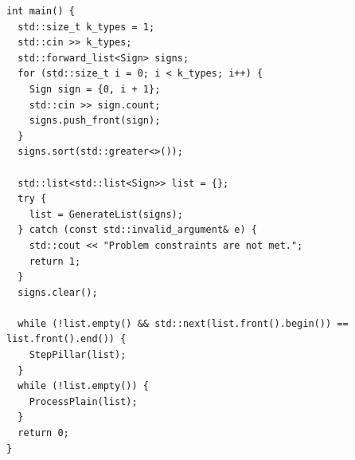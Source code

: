 \begin{lstlisting}
int main() {
  std::size_t k_types = 1;
  std::cin >> k_types;
  std::forward_list<Sign> signs;
  for (std::size_t i = 0; i < k_types; i++) {
    Sign sign = {0, i + 1};
    std::cin >> sign.count;
    signs.push_front(sign);
  }
  signs.sort(std::greater<>());

  std::list<std::list<Sign>> list = {};
  try {
    list = GenerateList(signs);
  } catch (const std::invalid_argument& e) {
    std::cout << "Problem constraints are not met.";
    return 1;
  }
  signs.clear();

  while (!list.empty() && std::next(list.front().begin()) == list.front().end()) {
    StepPillar(list);
  }
  while (!list.empty()) {
    ProcessPlain(list);
  }
  return 0;
}
\end{lstlisting}